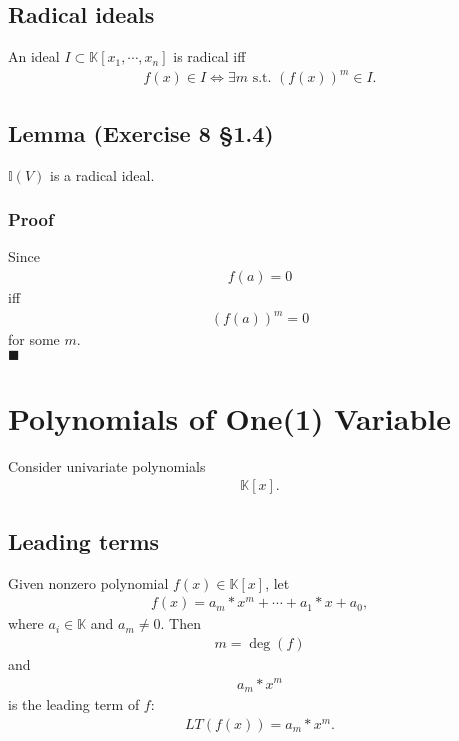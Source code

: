 \documentclass[11pt]{book}
\begin{document}
\subsection{Radical ideals}%
An ideal $I \subset \mathbb{K}[x_1,\cdots,x_n]$ is radical iff
\begin{eqnarray}
f(x) \in I \Leftrightarrow \exists m \text{ s.t. } \left( f(x) \right)^m \in I.
\end{eqnarray}

\subsection{Lemma (Exercise 8 \S 1.4)}
$\mathbb{I}(V)$ is a radical ideal.

\subsubsection{Proof}
Since
\begin{eqnarray}
f(a) = 0
\end{eqnarray}
iff
\begin{eqnarray}
\left( f(a)  \right)^m  = 0
\end{eqnarray}
for some $m$.\\
$\blacksquare$


\section{Polynomials of One(1) Variable}
Consider univariate polynomials
\begin{eqnarray}
\mathbb{K}[x].
\end{eqnarray}

\subsection{Leading terms}
Given nonzero polynomial $f(x) \in \mathbb{K}[x]$, let
\begin{eqnarray}
f(x) = a_m * x^m + \cdots + a_1 * x + a_0,
\end{eqnarray}
where $a_i \in \mathbb{K}$ and $a_m \neq 0$.
Then
\begin{eqnarray}
m = \deg(f)
\end{eqnarray}
and
\begin{eqnarray}
a_m * x^m
\end{eqnarray}
is the leading term of $f$:
\begin{eqnarray}
LT\left(f(x) \right) = a_m * x^m.
\end{eqnarray}
\end{document}
